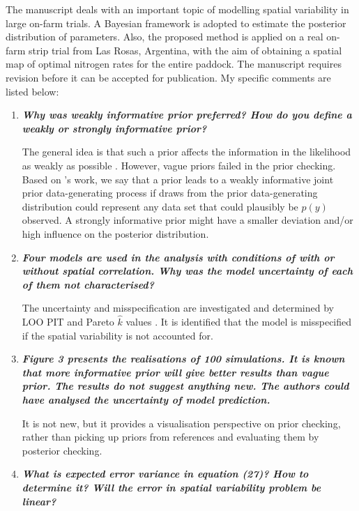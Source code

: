 \documentclass[a4paper]{article}   	%
\newcommand{\qtitle}[1]{\textit{\textbf{#1}}}
\begin{document}
The manuscript deals with an important topic of modelling spatial variability in large on-farm trials. A Bayesian framework is adopted to estimate the posterior distribution of parameters. Also, the proposed method is applied on a real on-farm strip trial from Las Rosas, Argentina, with the aim of obtaining a spatial map of optimal nitrogen rates for the entire paddock. The manuscript requires revision before it can be accepted for publication. My specific comments are listed below:
\begin{enumerate}
    \item \qtitle{Why was weakly informative prior preferred? How do you define a weakly or strongly informative prior?}
    
    The general idea is that such a prior affects the information in the likelihood as weakly as possible \parencite{Gelman2017Prior}. However, vague priors failed in the prior checking. Based on \textcite{Gabry2019Visualization}'s work, we say that a prior leads to a weakly informative joint prior data-generating process if draws from the prior data-generating distribution could represent any data set that could plausibly be $p(y)$ observed. A strongly informative prior might have a smaller deviation and/or high influence on the posterior distribution.
    
    \item \qtitle{Four models are used in the analysis with conditions of with or without spatial correlation. Why was the model uncertainty of each of them not characterised?}
    
    The uncertainty and misspecification are investigated and determined by LOO PIT and Pareto $\hat{k}$ values \parencite{Gabry2019Visualization}. It is identified that the model is misspecified if the spatial variability is not accounted for. 

    \item \qtitle{Figure 3 presents the realisations of 100 simulations. It is known that more informative prior will give better results than vague prior. The results do not suggest anything new. The authors could have analysed the uncertainty of model prediction.}
    
    It is not new, but it provides a visualisation perspective on prior checking, rather than picking up priors from references and evaluating them by posterior checking. 
    
    \item \qtitle{What is expected error variance in equation (27)? How to determine it? Will the error in spatial variability problem be linear?}
    

\end{enumerate}
\end{document}
